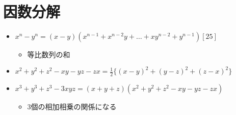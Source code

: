 \documentclass[dvipdfmx,uplatex]{jsarticle}
\begin{document}
\section{因数分解}
\begin{itemize}
	\item $ x^n - y^n = (x - y)(x^{n - 1} + x^{n - 2}y + … + xy^{n - 2} + y^{n - 1}) [25]$
	\begin{itemize}
		\item $ 等比数列の和$
	\end{itemize}
	\item $x^2+y^2+z^2-xy-yz-zx=\frac{1}{2}\{(x-y)^2+(y-z)^2+(z-x)^2\}$
	\item $x^3+y^3+z^3-3xyz=(x+y+z)(x^2+y^2+z^2-xy-yz-zx)$

	\begin{itemize}
		\item 3個の相加相乗の関係になる
	\end{itemize}
\end{itemize}
\end{document}
